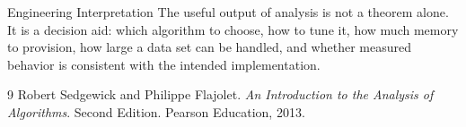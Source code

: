 \documentclass[11pt]{article}
\begin{document}
\begin{keybox}{Engineering Interpretation}
The useful output of analysis is not a theorem alone. It is a decision aid: which algorithm to choose, how to tune it, how much memory to provision, how large a data set can be handled, and whether measured behavior is consistent with the intended implementation.
\end{keybox}

\newpage
\begin{thebibliography}{9}
Robert Sedgewick and Philippe Flajolet.
\newblock \emph{An Introduction to the Analysis of Algorithms}.
\newblock Second Edition. Pearson Education, 2013.
\end{thebibliography}
\end{document}

